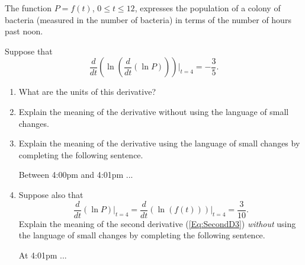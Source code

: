 \documentclass{ximera}
\begin{document}
\begin{question}  \label{Q54356dfdfgng}
The function $P=f(t)$, $0\leq t \leq 12$, expresses the population of a colony of bacteria (measured in the number of bacteria) in terms of the number of hours past noon.

Suppose that
\begin{equation}
   \frac{d}{dt} \left( \ln \left(  \frac{d}{dt} \left( \ln P \right)  \right) \right) \Big|_{t=4} =  -\frac{3}{5} .  \label{Eq:SecondD3}
\end{equation}


\begin{enumerate}
\item What are the units of this derivative?

\item Explain the meaning of the derivative without using the language of small changes.

\item Explain the meaning of the derivative using the language of small changes by completing the following sentence.

Between 4:00pm and 4:01pm  ...

\item Suppose also that
\[
   \frac{d}{dt} \left(  \ln P \right)\Big|_{t=4} = \frac{d}{dt} \left(  \ln (f(t)) \right)\Big|_{t=4}  = \frac{3}{10} .
\]
Explain the meaning of the second derivative (\ref{Eq:SecondD3}) \emph{without} using the language of small changes by completing the following sentence.

At 4:01pm  ...

\end{enumerate}
\end{question}
\end{document}
